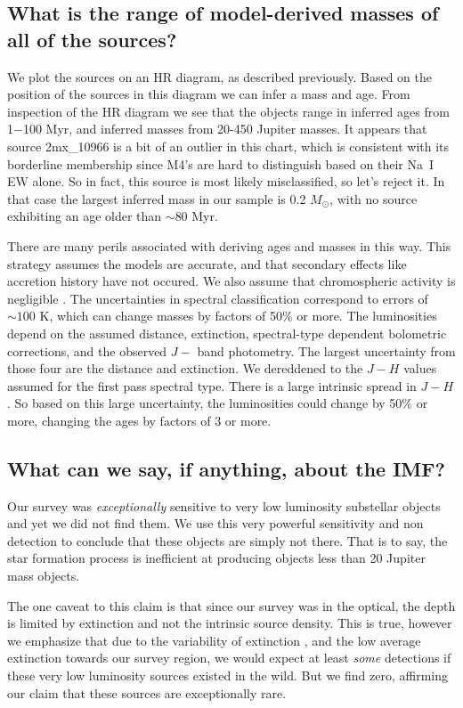 \documentclass[12pt,preprint]{aastex}
\begin{document}
\subsection{What is the range of model-derived masses of all of the sources?}
We plot the sources on an HR diagram, as described previously.  Based on the position of the sources in this diagram we can infer a mass and age.  From inspection of the HR diagram we see that the objects range in inferred ages from 1$-$100 Myr, and inferred masses from 20-450 Jupiter masses.  It appears that source 2mx\_10966 is a bit of an outlier in this chart, which is consistent with its borderline membership since M4's are hard to distinguish based on their Na~I EW alone.  So in fact, this source is most likely misclassified, so let's reject it.  In that case the largest inferred mass in our sample is 0.2 $M_{\odot}$, with no source exhibiting an age older than $\sim80$ Myr.


There are many perils associated with deriving ages and masses in this way.  This strategy assumes the models are accurate, and that secondary effects like accretion history have not occured.  We also assume that chromospheric activity is negligible \citep{2014ApJ...796..119S}.  The uncertainties in spectral classification correspond to errors of $\sim100$ K, which can change masses by factors of 50\% or more.  The luminosities depend on the assumed distance, extinction, spectral-type dependent bolometric corrections, and the observed $J-$ band photometry.  The largest uncertainty from those four are the distance and extinction.  We dereddened to the $J-H$ values assumed for the first pass spectral type.  There is a large intrinsic spread in $J-H$.  So based on this large uncertainty, the luminosities could change by 50\% or more, changing the ages by factors of 3 or more.  


\subsection{What can we say, if anything, about the IMF?}

Our survey was \emph{exceptionally} sensitive to very low luminosity substellar objects and yet we did not find them.  We use this very powerful sensitivity and non detection to conclude that these objects are simply not there.  That is to say, the star formation process is inefficient at producing objects less than 20 Jupiter mass objects.  

The one caveat to this claim is that since our survey was in the optical, the depth is limited by extinction and not the intrinsic source density.  This is true, however we emphasize that due to the variability of extinction \citep{2008A&A...489..143L}, and the low average extinction towards our survey region, we would expect at least \emph{some} detections if these very low luminosity sources existed in the wild.  But we find zero, affirming our claim that these sources are exceptionally rare.  
\end{document}
